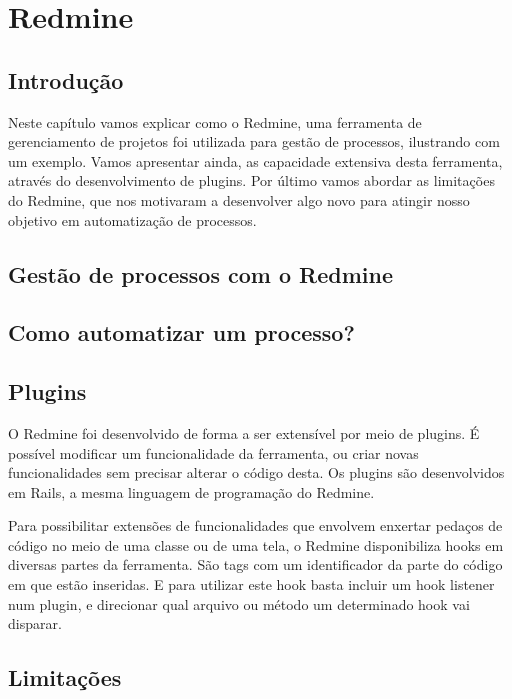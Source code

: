 \chapter{Redmine}\label{chp:redmine}

\section{Introdução}\label{sec:redmine-introducao}
Neste capítulo vamos explicar como o Redmine, uma ferramenta de gerenciamento de projetos foi utilizada para gestão de processos, ilustrando com um exemplo. Vamos apresentar ainda, as capacidade extensiva desta ferramenta, através do desenvolvimento de plugins. Por último vamos abordar as limitações do Redmine, que nos motivaram a desenvolver algo novo para atingir nosso objetivo em automatização de processos.

\section{Gestão de processos com o Redmine}\label{sec:redmine-gestao_processos}


\section{Como automatizar um processo?}\label{sec:redmine-automatizar_processo}

\section{Plugins}\label{sec:redmine-plugins}
O Redmine foi desenvolvido de forma a ser extensível por meio de plugins. É possível modificar um funcionalidade da ferramenta, ou criar novas funcionalidades sem precisar alterar o código desta. Os plugins são desenvolvidos em Rails, a mesma linguagem de programação do Redmine. 

Para possibilitar extensões de funcionalidades que envolvem enxertar pedaços de código no meio de uma classe ou de uma tela, o Redmine disponibiliza hooks em diversas partes da ferramenta. São tags com um identificador da parte do código em que estão inseridas. E para utilizar este hook basta incluir um hook listener num plugin, e direcionar qual arquivo ou método um determinado hook vai disparar.

\section{Limitações}\label{sec:redmine-limitacoes}

